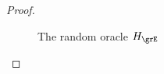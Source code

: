 \begin{proof}
\begin{itemize}
		\begin{figure}
			\begin{minipage}{.4\textwidth}

				\centering
				\noindent{}	
				\caption{The random oracle $ \hashG $}
				\label{oracle:HgnoPK}

			\end{minipage}%
			\begin{minipage}{0.6\textwidth}
				\centering
				\scriptsize
				\noindent{}
\end{minipage}
\end{figure}
\end{itemize}
\end{proof}
